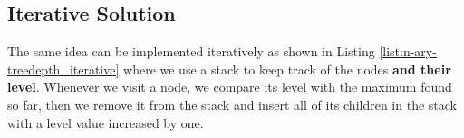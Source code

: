 

\subsection{Iterative Solution}
The same idea can be implemented iteratively as shown in Listing \ref{list:n-ary-treedepth_iterative} where we use a stack to keep track of the nodes \textbf{and their level}. Whenever we visit a node, we compare its level with the maximum found so far, then we remove it from the stack and insert all of its children in the stack with a level value increased by one. 






